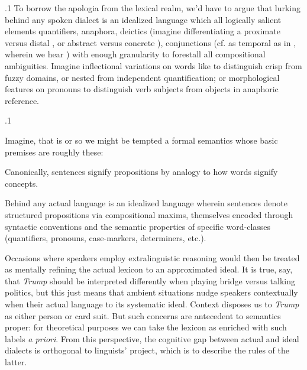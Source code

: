 \documentclass[11pt, twocolumn]{article}
\begin{document}
\p.1{%
\:\+To borrow the apologia from the lexical realm, we'd have to argue that
lurking behind any spoken dialect is an idealized language
which \pgl{} all logically salient elements \mdash{} quantifiers, anaphora, deictics
(imagine differentiating a proximate versus distal , or abstract versus concrete
),
conjunctions (cf.  as temporal as in ,
wherein we hear ) \mdash{} with enough granularity to forestall
all compositional ambiguities. \>  Imagine inflectional variations
on words like  to distinguish crisp from fuzzy domains, or nested from
independent quantification; or morphological features on pronouns to
distinguish verb subjects from objects in anaphoric reference.\<\;
}%

\p.1{%
\:\+Imagine, that is \mdash{} or so we might be tempted \mdash{} a formal semantics whose basic
premises are roughly these:   \> \vspace{-19pt}



\begin{docEnumerate}

\enumsItem{}   Canonically, sentences signify propositions \mdash{} by analogy to how words signify concepts. \> 

\enumsItem{}   Behind any actual language is an idealized language wherein sentences denote
structured propositions via compositional maxims, themselves encoded through
syntactic conventions and the semantic properties of specific word-classes
(quantifiers, pronouns, case-markers, determiners, etc.). \> 

\end{docEnumerate}

\nip{}%
Occasions where speakers employ extralinguistic reasoning
would then be treated as mentally refining the
actual lexicon to an approximated ideal. \> 
It is true, say, that \textit{Trump} should be interpreted differently
when playing bridge versus talking politics, but this just means that
ambient situations nudge speakers contextually when 
their actual language to its systematic ideal. \>  Context
disposes us to  \textit{Trump} as either person or card
suit. \>  But such concerns are antecedent to semantics proper: for theoretical
purposes we can take the lexicon as enriched with such labels \textit{a priori}. \> 
From this perspective, the cognitive gap between
actual and ideal dialects is orthogonal to linguists'
project, which is to describe the rules of the latter.\<\;
}%
\end{document}
